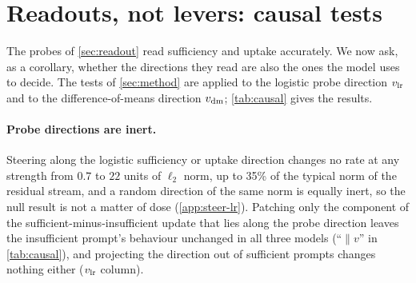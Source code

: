 \section{Readouts, not levers: causal tests}
\label{sec:causal}

The probes of \cref{sec:readout} read sufficiency and uptake accurately. We now ask, as a corollary, whether the directions they read are also the ones the model uses to decide. The tests of \cref{sec:method} are applied to the logistic probe direction $\vlr$ and to the difference-of-means direction $\vdm$; \cref{tab:causal} gives the results.

\begin{table}[t]
\centering\scriptsize
\setlength{\tabcolsep}{3pt}

\caption{Causal tests on 150 held-out questions, intervening at every layer from the best sufficiency layer onward. Left: the insufficient prompt with its anchor residual patched from the sufficient prompt (correct / answered rate). ``none'': no patch; ``full'': the whole residual; $\parallel v$ and $\perp v$: only the component along, or orthogonal to, the probe direction; ``rand-256'': a random 256-dimensional subspace; PC1, PC256: the top 1 or 256 principal components of training updates; ``unemb.'': the gold answer's unembedding direction. Right: the sufficient prompt with the component along a direction set to its insufficient-state value (answered rate). $\vdm$: difference-of-means direction; $\vlr$: logistic-probe direction.}
\label{tab:causal}
\end{table}

\paragraph{Probe directions are inert.}
Steering along the logistic sufficiency or uptake direction changes no rate at any strength from $0.7$ to $22$ units of $\ell_2$ norm, up to 35\% of the typical norm of the residual stream, and a random direction of the same norm is equally inert, so the null result is not a matter of dose (\cref{app:steer-lr}). Patching only the component of the sufficient-minus-insufficient update that lies along the probe direction leaves the insufficient prompt's behaviour unchanged in all three models (``$\parallel v$'' in \cref{tab:causal}), and projecting the direction out of sufficient prompts changes nothing either ($\vlr$ column).

